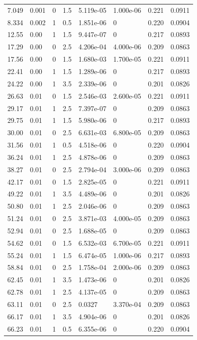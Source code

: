 \documentclass[preview]{standalone}
\begin{document}
{{\begin{tabular}{L{1.2cm}C{1.2cm} C{0.3cm}C{0.5cm} C{1.4cm}C{1.4cm} C{1.4cm}C{1.4cm}}
  7.049  &  0.001  & 0     & 1.5 &  5.119e-05  & 1.000e-06  & 0.221 &  0.0911   \\ 
  8.334  &  0.002  & 1     & 0.5 &  1.851e-06  & 0  & 0.220 &  0.0904   \\ 
  12.55  &  0.00  & 1     & 1.5 &  9.447e-07  & 0  & 0.217 &  0.0893   \\ 
  17.29  &  0.00  & 0     & 2.5 &  4.206e-04  & 4.000e-06  & 0.209 &  0.0863   \\ 
  17.56  &  0.00  & 0     & 1.5 &  1.680e-03  & 1.700e-05  & 0.221 &  0.0911   \\ 
  22.41  &  0.00  & 1     & 1.5 &  1.289e-06  & 0  & 0.217 &  0.0893   \\ 
  24.22  &  0.00  & 1     & 3.5 &  2.339e-06  & 0  & 0.201 &  0.0826   \\ 
  26.63  &  0.01  & 0     & 1.5 &  2.546e-03  & 2.600e-05  & 0.221 &  0.0911   \\ 
  29.17  &  0.01  & 1     & 2.5 &  7.397e-07  & 0  & 0.209 &  0.0863   \\ 
  29.75  &  0.01  & 1     & 1.5 &  5.980e-06  & 0  & 0.217 &  0.0893   \\ 
  30.00  &  0.01  & 0     & 2.5 &  6.631e-03  & 6.800e-05  & 0.209 &  0.0863   \\ 
  31.56  &  0.01  & 1     & 0.5 &  4.518e-06  & 0  & 0.220 &  0.0904   \\ 
  36.24  &  0.01  & 1     & 2.5 &  4.878e-06  & 0  & 0.209 &  0.0863   \\ 
  38.27  &  0.01  & 0     & 2.5 &  2.794e-04  & 3.000e-06  & 0.209 &  0.0863   \\ 
  42.17  &  0.01  & 0     & 1.5 &  2.825e-05  & 0  & 0.221 &  0.0911   \\ 
  49.22  &  0.01  & 1     & 3.5 &  4.489e-06  & 0  & 0.201 &  0.0826   \\ 
  50.80  &  0.01  & 1     & 2.5 &  2.046e-06  & 0  & 0.209 &  0.0863   \\ 
  51.24  &  0.01  & 0     & 2.5 &  3.871e-03  & 4.000e-05  & 0.209 &  0.0863   \\ 
  52.94  &  0.01  & 0     & 2.5 &  1.688e-05  & 0  & 0.209 &  0.0863   \\ 
  54.62  &  0.01  & 0     & 1.5 &  6.532e-03  & 6.700e-05  & 0.221 &  0.0911   \\ 
  55.24  &  0.01  & 1     & 1.5 &  6.474e-05  & 1.000e-06  & 0.217 &  0.0893   \\ 
  58.84  &  0.01  & 0     & 2.5 &  1.758e-04  & 2.000e-06  & 0.209 &  0.0863   \\ 
  62.45  &  0.01  & 1     & 3.5 &  1.473e-06  & 0  & 0.201 &  0.0826   \\ 
  62.78  &  0.01  & 1     & 2.5 &  4.137e-05  & 0  & 0.209 &  0.0863   \\ 
  63.11  &  0.01  & 0     & 2.5 &  0.0327  & 3.370e-04  & 0.209 &  0.0863   \\ 
  66.17  &  0.01  & 1     & 3.5 &  4.904e-06  & 0  & 0.201 &  0.0826   \\ 
  66.23  &  0.01  & 1     & 0.5 &  6.355e-06  & 0  & 0.220 &  0.0904   \\ 
\hline 
\end{tabular} 

}}
\end{document}
